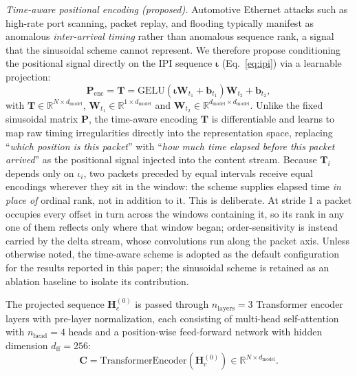 \noindent\textit{Time-aware positional encoding (proposed).} Automotive Ethernet attacks such as high-rate port scanning, packet replay, and flooding typically manifest as anomalous \emph{inter-arrival timing} rather than anomalous sequence rank, a signal that the sinusoidal scheme cannot represent. We therefore propose conditioning the positional signal directly on the IPI sequence $\boldsymbol{\iota}$ (Eq.~\eqref{eq:ipi}) via a learnable projection:
\begin{equation}
    \mathbf{P}_{\text{enc}} = \mathbf{T} =
    \text{GELU}\!\left(\boldsymbol{\iota}\mathbf{W}_{t_1} + \mathbf{b}_{t_1}\right)\mathbf{W}_{t_2} + \mathbf{b}_{t_2},
    \label{eq:timepe}
\end{equation}
with $\mathbf{T} \in \mathbb{R}^{N \times d_{\text{model}}}$, $\mathbf{W}_{t_1} \in \mathbb{R}^{1 \times d_{\text{model}}}$ and $\mathbf{W}_{t_2} \in \mathbb{R}^{d_{\text{model}} \times d_{\text{model}}}$. Unlike the fixed sinusoidal matrix $\mathbf{P}$, the time-aware encoding $\mathbf{T}$ is differentiable and learns to map raw timing irregularities directly into the representation space, replacing ``\emph{which position is this packet}'' with ``\emph{how much time elapsed before this packet arrived}'' as the positional signal injected into the content stream. Because $\mathbf{T}_i$ depends only on $\iota_i$, two packets preceded by equal intervals receive equal encodings wherever they sit in the window: the scheme supplies elapsed time \emph{in place of} ordinal rank, not in addition to it. This is deliberate. At stride 1 a packet occupies every offset in turn across the windows containing it, so its rank in any one of them reflects only where that window began; order-sensitivity is instead carried by the delta stream, whose convolutions run along the packet axis. Unless otherwise noted, the time-aware scheme is adopted as the default configuration for the results reported in this paper; the sinusoidal scheme is retained as an ablation baseline to isolate its contribution.

The projected sequence $\mathbf{H}^{(0)}_c$ is passed through $n_{\text{layers}} = 3$ Transformer encoder layers with pre-layer normalization, each consisting of multi-head self-attention with $n_{\text{head}} = 4$ heads and a position-wise feed-forward network with hidden dimension $d_{\text{ff}} = 256$:
\begin{equation}
    \mathbf{C} = \text{TransformerEncoder}(\mathbf{H}^{(0)}_c) \in \mathbb{R}^{N \times d_{\text{model}}}.
    \label{eq:transformer}
\end{equation}

